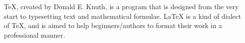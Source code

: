 \documentclass[a4paper,12pt]{article}
\begin{document}
TeX, created by Donald E. Knuth, is a program that is designed from the very
start to typesetting text and mathematical formulae. LaTeX is a kind of dialect
of TeX, and is aimed to help beginners/authors to format their work in a 
professional manner.
\end{document}
